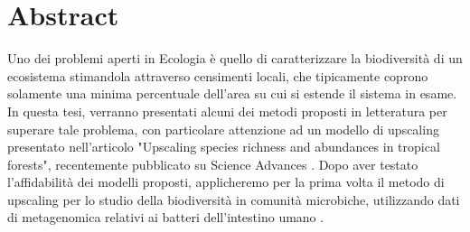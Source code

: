 \chapter{Abstract}
 

%
%


Uno dei problemi aperti in Ecologia è quello di caratterizzare la biodiversità di un ecosistema stimandola
attraverso censimenti locali, che tipicamente coprono solamente una minima percentuale dell'area su cui si estende il sistema in esame.
In questa tesi, verranno presentati alcuni dei metodi proposti in letteratura per superare tale problema, con particolare attenzione ad un modello di upscaling presentato nell'articolo "Upscaling species richness and abundances in tropical forests", recentemente pubblicato su Science Advances \cite{Tovoe1701438}. \newline
Dopo aver testato l'affidabilità dei modelli proposti, applicheremo per la prima volta il metodo di upscaling per lo studio della biodiversità in comunità microbiche, utilizzando dati di metagenomica relativi ai batteri dell'intestino umano \cite{shotgun}.